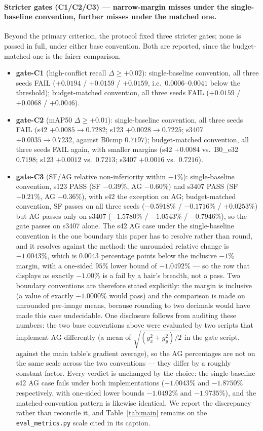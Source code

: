\documentclass[pdflatex,sn-mathphys-num]{sn-jnl}
\theoremstyle{thmstyleone}%
\theoremstyle{thmstyletwo}%
\theoremstyle{thmstylethree}%
\begin{document}
\paragraph{Stricter gates (C1/C2/C3) --- narrow-margin misses under the single-baseline convention, further misses under the matched one.}
Beyond the primary criterion, the protocol fixed three stricter gates; none is passed in full, under either base convention. Both are reported, since the budget-matched one is the fairer comparison.
\begin{itemize}
\item \textbf{gate-C1} (high-conflict recall $\Delta \geq +0.02$): single-baseline convention, all three seeds FAIL ($+0.0194$ / $+0.0159$ / $+0.0159$, i.e.\ $0.0006$--$0.0041$ below the threshold); budget-matched convention, all three seeds FAIL ($+0.0159$ / $+0.0068$ / $+0.0046$).
\item \textbf{gate-C2} (mAP50 $\Delta \geq +0.01$): single-baseline convention, all three seeds FAIL (s42 $+0.0085 \to 0.7282$; s123 $+0.0028 \to 0.7225$; s3407 $+0.0035 \to 0.7232$, against B0cmp $0.7197$); budget-matched convention, all three seeds FAIL again, with smaller margins (s42 $+0.0084$ vs.\ B0\_e32 $0.7198$; s123 $+0.0012$ vs.\ $0.7213$; s3407 $+0.0016$ vs.\ $0.7216$).
\item \textbf{gate-C3} (SF/AG relative non-inferiority within $-1\%$): single-baseline convention, s123 PASS (SF $-0.39\%$, AG $-0.60\%$) and s3407 PASS (SF $-0.21\%$, AG $-0.36\%$), with s42 the exception on AG; budget-matched convention, SF passes on all three seeds ($-0.5918\%$ / $-0.1716\%$ / $+0.0253\%$) but AG passes only on s3407 ($-1.5780\%$ / $-1.0543\%$ / $-0.7946\%$), so the gate passes on s3407 alone. The s42 AG case under the single-baseline convention is the one boundary this paper has to resolve rather than round, and it resolves against the method: the unrounded relative change is $-1.0043\%$, which is $0.0043$ percentage points below the inclusive $-1\%$ margin, with a one-sided $95\%$ lower bound of $-1.0492\%$ --- so the row that displays as exactly $-1.00\%$ is a fail by a hair's breadth, not a pass. Two boundary conventions are therefore stated explicitly: the margin is inclusive (a value of exactly $-1.0000\%$ would pass) and the comparison is made on unrounded per-image means, because rounding to two decimals would have made this case undecidable. One disclosure follows from auditing these numbers: the two base conventions above were evaluated by two scripts that implement AG differently (a mean of $\sqrt{(g_x^2+g_y^2)/2}$ in the gate script, against the main table's gradient average), so the AG percentages are not on the same scale across the two conventions --- they differ by a roughly constant factor. Every verdict is unchanged by the choice: the single-baseline s42 AG case fails under both implementations ($-1.0043\%$ and $-1.8750\%$ respectively, with one-sided lower bounds $-1.0492\%$ and $-1.9735\%$), and the matched-convention pattern is likewise identical. We report the discrepancy rather than reconcile it, and Table~\ref{tab:main} remains on the \texttt{eval\_metrics.py} scale cited in its caption.
\end{itemize}
\end{document}
